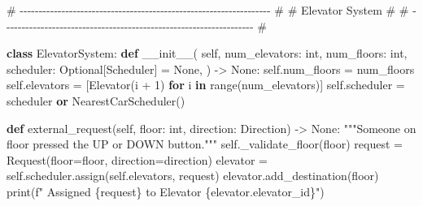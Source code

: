 \documentclass[11pt]{article}
\newenvironment{Shaded}{\begin{snugshade}}{\end{snugshade}}
\newcommand{\BuiltInTok}[1]{\textcolor[rgb]{0.50,0.55,0.55}{#1}}
\newcommand{\CommentTok}[1]{\textcolor[rgb]{0.48,0.49,0.49}{#1}}
\newcommand{\ControlFlowTok}[1]{\textcolor[rgb]{0.99,0.74,0.29}{\textbf{#1}}}
\newcommand{\DecValTok}[1]{\textcolor[rgb]{0.96,0.45,0.00}{#1}}
\newcommand{\FunctionTok}[1]{\textcolor[rgb]{0.56,0.27,0.68}{#1}}
\newcommand{\KeywordTok}[1]{\textcolor[rgb]{0.81,0.81,0.76}{\textbf{#1}}}
\newcommand{\NormalTok}[1]{\textcolor[rgb]{0.81,0.81,0.76}{#1}}
\newcommand{\OperatorTok}[1]{\textcolor[rgb]{0.81,0.81,0.76}{#1}}
\newcommand{\SpecialCharTok}[1]{\textcolor[rgb]{0.24,0.68,0.91}{#1}}
\newcommand{\SpecialStringTok}[1]{\textcolor[rgb]{0.85,0.27,0.33}{#1}}
\newcommand{\VariableTok}[1]{\textcolor[rgb]{0.15,0.68,0.68}{#1}}
\begin{document}
\begin{Shaded}
\begin{Highlighting}[]
\CommentTok{\# {-}{-}{-}{-}{-}{-}{-}{-}{-}{-}{-}{-}{-}{-}{-}{-}{-}{-}{-}{-}{-}{-}{-}{-}{-}{-}{-}{-}{-}{-}{-}{-}{-}{-}{-}{-}{-}{-}{-}{-}{-}{-}{-}{-}{-}{-}{-}{-}{-}{-}{-}{-}{-}{-}{-}{-}{-}{-}{-}{-}{-}{-}{-}{-}{-}{-} \#}
\CommentTok{\# Elevator System                                                     \#}
\CommentTok{\# {-}{-}{-}{-}{-}{-}{-}{-}{-}{-}{-}{-}{-}{-}{-}{-}{-}{-}{-}{-}{-}{-}{-}{-}{-}{-}{-}{-}{-}{-}{-}{-}{-}{-}{-}{-}{-}{-}{-}{-}{-}{-}{-}{-}{-}{-}{-}{-}{-}{-}{-}{-}{-}{-}{-}{-}{-}{-}{-}{-}{-}{-}{-}{-}{-}{-} \#}

\KeywordTok{class}\NormalTok{ ElevatorSystem:}
    \KeywordTok{def} \FunctionTok{\_\_init\_\_}\NormalTok{(}
        \VariableTok{self}\NormalTok{,}
\NormalTok{        num\_elevators: }\BuiltInTok{int}\NormalTok{,}
\NormalTok{        num\_floors: }\BuiltInTok{int}\NormalTok{,}
\NormalTok{        scheduler: Optional[Scheduler] }\OperatorTok{=} \VariableTok{None}\NormalTok{,}
\NormalTok{    ) }\OperatorTok{{-}\textgreater{}} \VariableTok{None}\NormalTok{:}
        \VariableTok{self}\NormalTok{.num\_floors }\OperatorTok{=}\NormalTok{ num\_floors}
        \VariableTok{self}\NormalTok{.elevators }\OperatorTok{=}\NormalTok{ [Elevator(i }\OperatorTok{+} \DecValTok{1}\NormalTok{) }\ControlFlowTok{for}\NormalTok{ i }\KeywordTok{in} \BuiltInTok{range}\NormalTok{(num\_elevators)]}
        \VariableTok{self}\NormalTok{.scheduler }\OperatorTok{=}\NormalTok{ scheduler }\KeywordTok{or}\NormalTok{ NearestCarScheduler()}

    \KeywordTok{def}\NormalTok{ external\_request(}\VariableTok{self}\NormalTok{, floor: }\BuiltInTok{int}\NormalTok{, direction: Direction) }\OperatorTok{{-}\textgreater{}} \VariableTok{None}\NormalTok{:}
        \CommentTok{"""Someone on \textasciigrave{}floor\textasciigrave{} pressed the UP or DOWN button."""}
        \VariableTok{self}\NormalTok{.\_validate\_floor(floor)}
\NormalTok{        request }\OperatorTok{=}\NormalTok{ Request(floor}\OperatorTok{=}\NormalTok{floor, direction}\OperatorTok{=}\NormalTok{direction)}
\NormalTok{        elevator }\OperatorTok{=} \VariableTok{self}\NormalTok{.scheduler.assign(}\VariableTok{self}\NormalTok{.elevators, request)}
\NormalTok{        elevator.add\_destination(floor)}
        \BuiltInTok{print}\NormalTok{(}\SpecialStringTok{f"  Assigned }\SpecialCharTok{\{}\NormalTok{request}\SpecialCharTok{\}}\SpecialStringTok{ to Elevator }\SpecialCharTok{\{}\NormalTok{elevator}\SpecialCharTok{.}\NormalTok{elevator\_id}\SpecialCharTok{\}}\SpecialStringTok{"}\NormalTok{)}


\end{Highlighting}
\end{Shaded}
\end{document}
